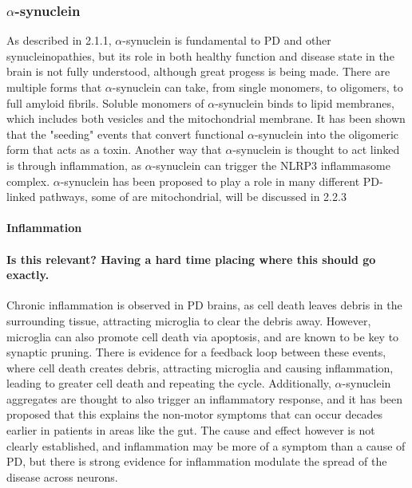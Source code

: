 \documentclass{article}
\begin{document}
\subsubsection{$\alpha$-synuclein}
As described in 2.1.1, $\alpha$-synuclein is fundamental to PD and other synucleinopathies, but its role in both healthy function and disease state in the brain is not fully understood, although great progess is being made. There are multiple forms that $\alpha$-synuclein can take, from single monomers, to oligomers, to full amyloid fibrils\cite{Mehra2019-SynucleinPathogenesis}. Soluble monomers of $\alpha$-synuclein binds to lipid membranes, which includes both vesicles and the mitochondrial membrane\cite{Burre2018Cell-Synuclein}. It has been shown that the "seeding" events that convert functional $\alpha$-synuclein into the oligomeric form that acts as a toxin\cite{Choi2022PathologicalToxicity}.
Another way that $\alpha$-synuclein is thought to act linked is through inflammation, as $\alpha$-synuclein can trigger the NLRP3 inflammasome complex\cite{Forloni2023AlphaInflammation}. $\alpha$-synuclein has been proposed to play a role in many different PD-linked pathways, some of are mitochondrial, will be discussed in 2.2.3
\paragraph{Inflammation}
\paragraph{Is this relevant? Having a hard time placing where this should go exactly.}
Chronic inflammation is observed in PD brains, as cell death leaves debris in the surrounding tissue, attracting microglia to clear the debris away\cite{Pajares2020InflammationImplications}. However, microglia can also promote cell death via apoptosis, and are known to be key to synaptic pruning. There is evidence for a feedback loop between these events, where cell death creates debris, attracting microglia and causing inflammation, leading to greater cell death and repeating the cycle. Additionally, $\alpha$-synuclein aggregates are thought to also trigger an inflammatory response, and it has been proposed that this explains the non-motor symptoms that can occur decades earlier in patients in areas like the gut\cite{Forloni2023AlphaInflammation}. The cause and effect however is not clearly established, and inflammation may be more of a symptom than a cause of PD, but there is strong evidence for inflammation modulate the spread of the disease across neurons.
\end{document}
